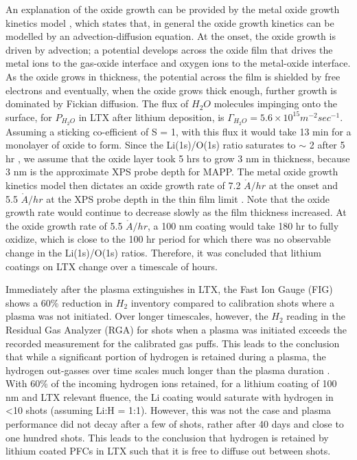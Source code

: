 \documentclass[aip,rsi,amsmath,amssymb,reprint]{revtex4-1}
\begin{document}
An explanation of the oxide growth can be provided by the metal oxide growth kinetics model  \cite{53}, which states that, in general the oxide growth kinetics can be modelled by an advection-diffusion equation. At the onset, the oxide growth is driven by advection; a potential develops across the oxide film that drives the metal ions to the gas-oxide interface and oxygen ions to the metal-oxide interface. As the oxide grows in thickness, the potential across the film is shielded by free electrons and eventually, when the oxide grows thick enough, further growth is dominated by Fickian diffusion. The flux of $H_2O$ molecules impinging onto the surface, for $P_{H_2O}$ in LTX after lithium deposition, is $\Gamma_{H_2O} = 5.6 \times 10^{15} m^{-2}sec^{-1}$. Assuming a sticking co-efficient\cite{51} of S = 1, with this flux it would take 13 min for a monolayer of oxide to form. Since the Li(1s)/O(1s) ratio saturates to $\sim$ 2 after 5 hr \cite{lucia-thesis,lucia-paper}, we assume that the oxide layer took 5 hrs to grow 3 nm in thickness, because 3 nm is the approximate XPS probe depth for MAPP. The metal oxide growth kinetics model then dictates an oxide growth rate of 7.2 $\mathring{A}/hr$ at the onset and 5.5 $\mathring{A}/hr$ at the XPS probe depth in the thin film limit \cite{thin-film}. Note that the oxide growth rate would continue to decrease slowly as the film thickness increased. At the oxide growth rate of 5.5 $\mathring{A}/hr$, a 100 nm coating would take 180 hr to fully oxidize, which is close to the 100 hr period for which there was no observable change in the Li(1s)/O(1s) ratios. \cite{lucia-thesis,lucia-paper} Therefore, it was concluded that lithium coatings on LTX change over a timescale of hours. 

Immediately after the plasma extinguishes in LTX, the Fast Ion Gauge (FIG) shows a 60\% reduction in $H_2$ inventory compared to calibration shots where a plasma was not initiated. Over longer timescales, however, the $H_2$ reading in the Residual Gas Analyzer (RGA) for shots when a plasma was initiated exceeds the recorded measurement for the calibrated gas puffs. This leads to the conclusion that while a significant portion of hydrogen is retained during a plasma, the hydrogen out-gasses over time scales much longer than the plasma duration \cite{bob-lucia,boyle-prl}. With 60\% of the incoming hydrogen ions retained, for a lithium coating of 100 nm and LTX relevant fluence, the Li coating would saturate with hydrogen in \textless 10 shots (assuming Li:H = 1:1). However, this was not the case and plasma performance did not decay after a few of shots, rather after 40 days and close to one hundred shots. This leads to the conclusion that hydrogen is retained by lithium coated PFCs in LTX such that it is free to diffuse out between shots.
\end{document}
